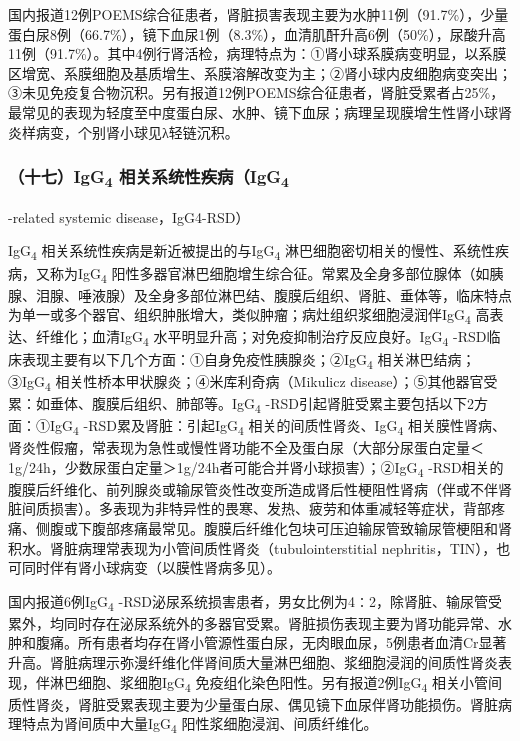 国内报道12例POEMS综合征患者，肾脏损害表现主要为水肿11例（91.7\%），少量蛋白尿8例（66.7\%），镜下血尿1例（8.3\%），血清肌酐升高6例（50\%），尿酸升高11例（91.7\%）。其中4例行肾活检，病理特点为：①肾小球系膜病变明显，以系膜区增宽、系膜细胞及基质增生、系膜溶解改变为主；②肾小球内皮细胞病变突出；③未见免疫复合物沉积。另有报道12例POEMS综合征患者，肾脏受累者占25\%，最常见的表现为轻度至中度蛋白尿、水肿、镜下血尿；病理呈现膜增生性肾小球肾炎样病变，个别肾小球见λ轻链沉积。

\subsubsection{（十七）IgG\textsubscript{4} 相关系统性疾病（IgG\textsubscript{4}}
-related systemic disease，IgG4-RSD）

IgG\textsubscript{4} 相关系统性疾病是新近被提出的与IgG\textsubscript{4}
淋巴细胞密切相关的慢性、系统性疾病，又称为IgG\textsubscript{4}
阳性多器官淋巴细胞增生综合征。常累及全身多部位腺体（如胰腺、泪腺、唾液腺）及全身多部位淋巴结、腹膜后组织、肾脏、垂体等，临床特点为单一或多个器官、组织肿胀增大，类似肿瘤；病灶组织浆细胞浸润伴IgG\textsubscript{4}
高表达、纤维化；血清IgG\textsubscript{4}
水平明显升高；对免疫抑制治疗反应良好。IgG\textsubscript{4}
-RSD临床表现主要有以下几个方面：①自身免疫性胰腺炎；②IgG\textsubscript{4}
相关淋巴结病；③IgG\textsubscript{4}
相关性桥本甲状腺炎；④米库利奇病（Mikulicz
disease）；⑤其他器官受累：如垂体、腹膜后组织、肺部等。IgG\textsubscript{4}
-RSD引起肾脏受累主要包括以下2方面：①IgG\textsubscript{4}
-RSD累及肾脏：引起IgG\textsubscript{4}
相关的间质性肾炎、IgG\textsubscript{4}
相关膜性肾病、肾炎性假瘤，常表现为急性或慢性肾功能不全及蛋白尿（大部分尿蛋白定量＜1g/24h，少数尿蛋白定量＞1g/24h者可能合并肾小球损害）；②IgG\textsubscript{4}
-RSD相关的腹膜后纤维化、前列腺炎或输尿管炎性改变所造成肾后性梗阻性肾病（伴或不伴肾脏间质损害）。多表现为非特异性的畏寒、发热、疲劳和体重减轻等症状，背部疼痛、侧腹或下腹部疼痛最常见。腹膜后纤维化包块可压迫输尿管致输尿管梗阻和肾积水。肾脏病理常表现为小管间质性肾炎（tubulointerstitial
nephritis，TIN），也可同时伴有肾小球病变（以膜性肾病多见）。

国内报道6例IgG\textsubscript{4}
-RSD泌尿系统损害患者，男女比例为4∶2，除肾脏、输尿管受累外，均同时存在泌尿系统外的多器官受累。肾脏损伤表现主要为肾功能异常、水肿和腹痛。所有患者均存在肾小管源性蛋白尿，无肉眼血尿，5例患者血清Cr显著升高。肾脏病理示弥漫纤维化伴肾间质大量淋巴细胞、浆细胞浸润的间质性肾炎表现，伴淋巴细胞、浆细胞IgG\textsubscript{4}
免疫组化染色阳性。另有报道2例IgG\textsubscript{4}
相关小管间质性肾炎，肾脏受累表现主要为少量蛋白尿、偶见镜下血尿伴肾功能损伤。肾脏病理特点为肾间质中大量IgG\textsubscript{4}
阳性浆细胞浸润、间质纤维化。

